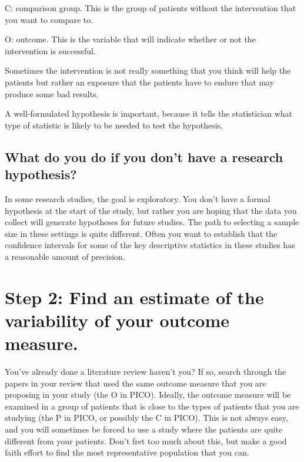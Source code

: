 \documentclass[
  letterpaper,
  DIV=11,
  numbers=noendperiod]{scrreprt}
\begin{document}
C: comparison group. This is the group of patients without the
intervention that you want to compare to.

O: outcome. This is the variable that will indicate whether or not the
intervention is successful.

Sometimes the intervention is not really something that you think will
help the patients but rather an exposure that the patients have to
endure that may produce some bad results.

A well-formulated hypothesis is important, because it tells the
statistician what type of statistic is likely to be needed to test the
hypothesis.

\hypertarget{what-do-you-do-if-you-dont-have-a-research-hypothesis}{%
\subsection{What do you do if you don't have a research
hypothesis?}\label{what-do-you-do-if-you-dont-have-a-research-hypothesis}}

In some research studies, the goal is exploratory. You don't have a
formal hypothesis at the start of the study, but rather you are hoping
that the data you collect will generate hypotheses for future studies.
The path to selecting a sample size in these settings is quite
different. Often you want to establish that the confidence intervals for
some of the key descriptive statistics in these studies has a reasonable
amount of precision.

\hypertarget{step-2-find-an-estimate-of-the-variability-of-your-outcome-measure.}{%
\section{Step 2: Find an estimate of the variability of your outcome
measure.}\label{step-2-find-an-estimate-of-the-variability-of-your-outcome-measure.}}

You've already done a literature review haven't you? If so, search
through the papers in your review that used the same outcome measure
that you are proposing in your study (the O in PICO). Ideally, the
outcome measure will be examined in a group of patients that is close to
the types of patients that you are studying (the P in PICO, or possibly
the C in PICO). This is not always easy, and you will sometimes be
forced to use a study where the patients are quite different from your
patients. Don't fret too much about this, but make a good faith effort
to find the most representative population that you can.
\end{document}
